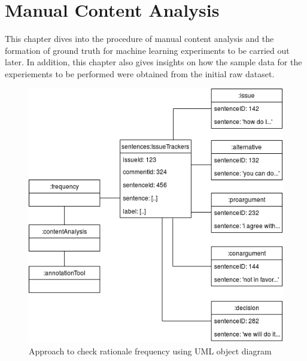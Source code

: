 \documentclass[a4paper,12pt,twoside]{report}
\begin{document}

\chapter{Manual Content Analysis}

This chapter dives into the procedure of manual content analysis and the formation of ground truth for machine learning experiments to be carried out later. In addition, this chapter also gives insights on how the sample data for the experiements to be performed were obtained from the initial raw dataset. 

\begin{figure}[h] %
    \centering
    \includegraphics[width=12cm]{frequency-object-diagram}
    \caption{Approach to check rationale frequency using UML object diagram}
    \label{fig:frequencyModel}
\end{figure}
\end{document}
